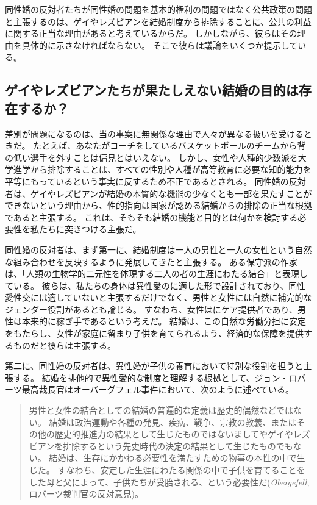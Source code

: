 \documentclass[paper=a4,book,openany]{jlreq} \usepackage{mystyle}
\begin{document}
同性婚の反対者たちが同性婚の問題を基本的権利の問題ではなく公共政策の問題と主張するのは、ゲイやレズビアンを結婚制度から排除することに、公共の利益に関する正当な理由があると考えているからだ。
しかしながら、彼らはその理由を具体的に示さなければならない。
そこで彼らは議論をいくつか提示している。

\subsection{ゲイやレズビアンたちが果たしえない結婚の目的は存在するか？}

差別が問題になるのは、当の事案に無関係な理由で人々が異なる扱いを受けるときだ。
たとえば、あなたがコーチをしているバスケットボールのチームから背の低い選手を外すことは偏見とはいえない。
しかし、女性や人種的少数派を大学進学から排除することは、すべての性別や人種が高等教育に必要な知的能力を平等にもっているという事実に反するため不正であるとされる。
同性婚の反対者は、ゲイやレズビアンが結婚の本質的な機能の少なくとも一部を果たすことができないという理由から、性的指向は国家が認める結婚からの排除の正当な根拠であると主張する。
これは、そもそも結婚の機能と目的とは何かを検討する必要性を私たちに突きつける主張だ。

同性婚の反対者は、まず第一に、結婚制度は一人の男性と一人の女性という自然な組み合わせを反映するように発展してきたと主張する。
ある保守派の作家は、「人類の生物学的二元性を体現する二人の者の生涯にわたる結合」と表現している\citep{jensen15:_i_oppos_same_sex_marriag}。
彼らは、私たちの身体は異性愛のに適した形で設計されており、同性愛性交には適していないと主張するだけでなく、男性と女性には自然に補完的なジェンダー役割があるとも論じる。
すなわち、女性はにケア提供者であり、男性は本来的に稼ぎ手であるという考えだ。
結婚は、この自然な労働分担に安定をもたらし、女性が家庭に留まり子供を育てられるよう、経済的な保障を提供するものだと彼らは主張する。

第二に、同性婚の反対者は、異性婚が子供の養育において特別な役割を担うと主張する。
結婚を排他的で異性愛的な制度と理解する根拠として、ジョン・ロバーツ最高裁長官はオーバーグフェル事件において、次のように述べている。

\begin{quote}
男性と女性の結合としての結婚の普遍的な定義は歴史的偶然などではない。
結婚は政治運動や各種の発見、疾病、戦争、宗教の教義、またはその他の歴史的推進力の結果として生じたものではない{\DDASH}ましてやゲイやレズビアンを排除するという先史時代の決定の結果として生じたものでもない。
結婚は、生存にかかわる必要性を満たすための物事の本性の中で生じた。
すなわち、安定した生涯にわたる関係の中で子供を育てることをした母と父によって、子供たちが受胎される、という必要性だ(\emph{Obergefell}, ロバーツ裁判官の反対意見)。

\end{quote}
\end{document}
